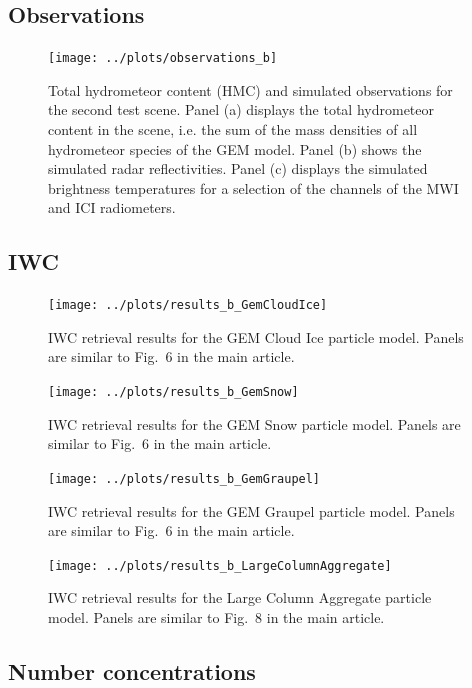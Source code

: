 \documentclass[journal abbreviation, manuscript]{copernicus}
\begin{document}
\clearpage
\subsection{Observations}
\begin{figure}[!hbpt]
\centering
\texttt{[image: ../plots/observations\_b]}
\caption{Total hydrometeor content (HMC) and simulated observations for the second test
  scene. Panel (a) displays the total hydrometeor content in the scene, i.e. the
  sum of the mass densities of all hydrometeor species of the GEM model. Panel
  (b) shows the simulated radar reflectivities. Panel (c) displays the simulated
  brightness temperatures for a selection of the channels of the MWI and ICI
  radiometers.}
\end{figure}



\subsection{IWC}

\clearpage
\begin{figure}[!hbpt]
\centering
\texttt{[image: ../plots/results\_b\_GemCloudIce]}
\caption{IWC retrieval results for the GEM Cloud Ice particle model. Panels
  are similar to Fig.~6 in the main article.}
\end{figure}

\clearpage
\begin{figure}[!hbpt]
\centering
\texttt{[image: ../plots/results\_b\_GemSnow]}
\caption{IWC retrieval results for the GEM Snow particle model. Panels
  are similar to Fig.~6 in the main article.}
\end{figure}

\clearpage
\begin{figure}[!hbpt]
\centering
\texttt{[image: ../plots/results\_b\_GemGraupel]}
\caption{IWC retrieval results for the GEM Graupel particle model. Panels
  are similar to Fig.~6 in the main article.}
\end{figure}

\clearpage
\begin{figure}[!hbpt]
\centering
\texttt{[image: ../plots/results\_b\_LargeColumnAggregate]}
\caption{IWC retrieval results for the Large Column Aggregate particle model. Panels
  are similar to Fig.~8 in the main article.}
\end{figure}

\subsection{Number concentrations}
\end{document}
